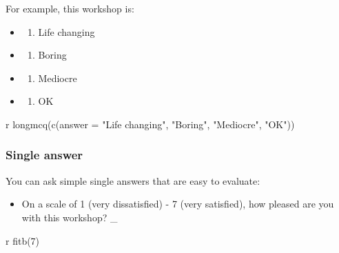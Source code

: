 \documentclass[
  letterpaper,
  DIV=11,
  numbers=noendperiod]{scrreprt}
\newenvironment{Shaded}{\begin{snugshade}}{\end{snugshade}}
\newcommand{\AttributeTok}[1]{\textcolor[rgb]{0.40,0.45,0.13}{#1}}
\newcommand{\StringTok}[1]{\textcolor[rgb]{0.13,0.47,0.30}{#1}}
\providecommand{\tightlist}{%
  \setlength{\itemsep}{0pt}\setlength{\parskip}{0pt}}\usepackage{longtable,booktabs,array}
\begin{document}
For example, this workshop is:

\begin{itemize}
\tightlist
\item
  \begin{enumerate}
  \def\labelenumi{(\Alph{enumi})}
  \tightlist
  \item
    Life changing\\
  \end{enumerate}
\item
  \begin{enumerate}
  \def\labelenumi{(\Alph{enumi})}
  \setcounter{enumi}{1}
  \tightlist
  \item
    Boring\\
  \end{enumerate}
\item
  \begin{enumerate}
  \def\labelenumi{(\Alph{enumi})}
  \setcounter{enumi}{2}
  \tightlist
  \item
    Mediocre\\
  \end{enumerate}
\item
  \begin{enumerate}
  \def\labelenumi{(\Alph{enumi})}
  \setcounter{enumi}{3}
  \tightlist
  \item
    OK
  \end{enumerate}
\end{itemize}

\begin{Shaded}
\begin{Highlighting}[]
\StringTok{\textasciigrave{}}\AttributeTok{r longmcq(c(answer = "Life changing", "Boring", "Mediocre", "OK"))}\StringTok{\textasciigrave{}} 
\end{Highlighting}
\end{Shaded}

\subsubsection{Single answer}\label{single-answer}

You can ask simple single answers that are easy to evaluate:

\begin{itemize}
\tightlist
\item
  On a scale of 1 (very dissatisfied) - 7 (very satisfied), how pleased
  are you with this workshop? \_
\end{itemize}

\begin{Shaded}
\begin{Highlighting}[]
\StringTok{\textasciigrave{}}\AttributeTok{r fitb(7)}\StringTok{\textasciigrave{}}
\end{Highlighting}
\end{Shaded}
\end{document}
